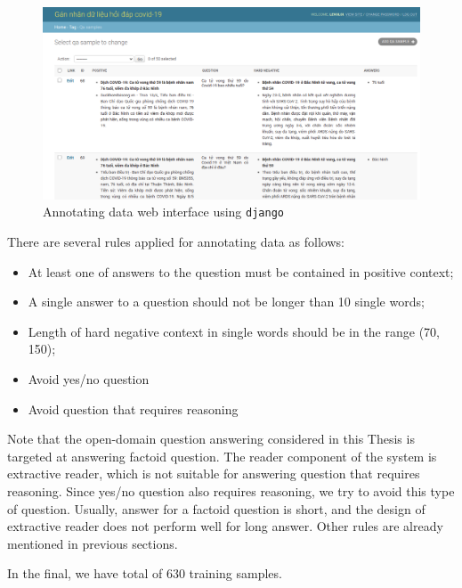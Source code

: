 \documentclass[3p, sort&compress, 12pt]{elsarticle}
\begin{document}
\begin{figure}[!htbp]
	\centering
	\includegraphics[scale=.3]{images/annotate.png}
	\caption{Annotating data web interface using {\tt django}}
	\label{fig:10}
\end{figure}
There are several rules applied for annotating data as follows:
\begin{itemize}
	\item At least one of answers to the question must be contained in positive context;
	\item A single answer to a question should not be longer than 10 single words;
	\item Length of hard negative context in single words should be in the range (70, 150);
	\item Avoid yes/no question
	\item Avoid question that requires reasoning
\end{itemize}
Note that the open-domain question answering considered in this Thesis is targeted at answering factoid question. The reader component of the system is extractive reader, which is not suitable for answering question that requires reasoning. Since yes/no question also requires reasoning, we try to avoid this type of question. Usually, answer for a factoid question is short, and the design of extractive reader does not perform well for long answer. Other rules are already mentioned in previous sections.
\par In the final, we have total of 630 training samples. 
\end{document}
